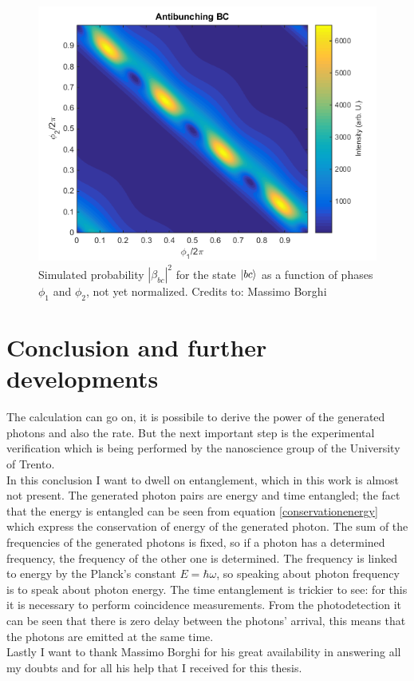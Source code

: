 \begin{figure}
\centering
\includegraphics[width = .8\textwidth]{img/Antibunching_BC}
\caption{Simulated probability $|\beta_{bc}|^2$ for the state $\ket{bc}$ as a function of phases $\phi_1$ and $\phi_2$, not yet normalized. Credits to: Massimo Borghi}\label{antibounchstate}
\end{figure}

\section{Conclusion and further developments}
The calculation can go on, it is possibile to derive the power of the generated photons and also the rate. But the next important step is the experimental verification which is being performed by the nanoscience group of the University of Trento.\\
In this conclusion I want to dwell on entanglement, which in this work is almost not present. The generated photon pairs are energy and time entangled; the fact that the energy is entangled can be seen from equation \eqref{conservationenergy} which express the conservation of energy of the generated photon. The sum of the frequencies of the generated photons is fixed, so if a photon has a determined frequency, the frequency of the other one is determined. The frequency is linked to energy by the Planck's constant $E = \hbar \omega$, so speaking about photon frequency is to speak about photon energy. The time entanglement is trickier to see: for this it is necessary to perform coincidence measurements. From the photodetection it can be seen that there is zero delay between the photons' arrival, this means that the photons are emitted at the same time.\\
Lastly I want to thank Massimo Borghi for his great availability in answering all my doubts and for all his help that I received for this thesis.